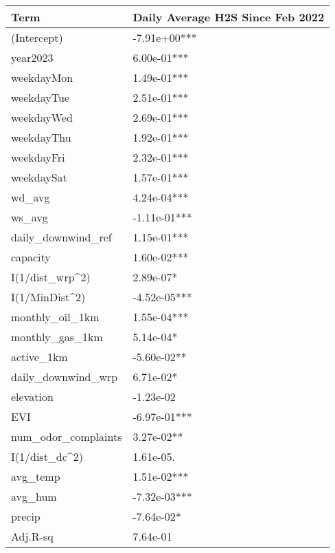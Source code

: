 
\begin{tabular}{l|l}
\hline
Term & Daily Average H2S Since Feb 2022\\
\hline
(Intercept) & -7.91e+00***\\
\hline
year2023 & 6.00e-01***\\
\hline
weekdayMon & 1.49e-01***\\
\hline
weekdayTue & 2.51e-01***\\
\hline
weekdayWed & 2.69e-01***\\
\hline
weekdayThu & 1.92e-01***\\
\hline
weekdayFri & 2.32e-01***\\
\hline
weekdaySat & 1.57e-01***\\
\hline
wd\_avg & 4.24e-04***\\
\hline
ws\_avg & -1.11e-01***\\
\hline
daily\_downwind\_ref & 1.15e-01***\\
\hline
capacity & 1.60e-02***\\
\hline
I(1/dist\_wrp\textasciicircum{}2) & 2.89e-07*\\
\hline
I(1/MinDist\textasciicircum{}2) & -4.52e-05***\\
\hline
monthly\_oil\_1km & 1.55e-04***\\
\hline
monthly\_gas\_1km & 5.14e-04*\\
\hline
active\_1km & -5.60e-02**\\
\hline
daily\_downwind\_wrp & 6.71e-02*\\
\hline
elevation & -1.23e-02\\
\hline
EVI & -6.97e-01***\\
\hline
num\_odor\_complaints & 3.27e-02**\\
\hline
I(1/dist\_dc\textasciicircum{}2) & 1.61e-05.\\
\hline
avg\_temp & 1.51e-02***\\
\hline
avg\_hum & -7.32e-03***\\
\hline
precip & -7.64e-02*\\
\hline
Adj.R-sq & 7.64e-01\\
\hline
\end{tabular}
